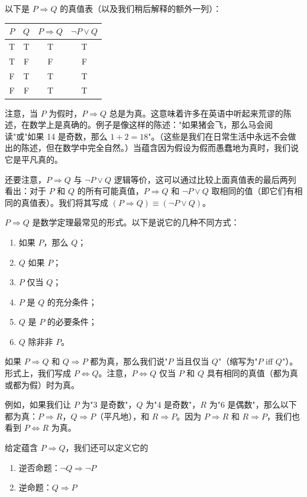\documentclass[11pt]{article}
\begin{document}
以下是 $P \Rightarrow Q$ 的真值表（以及我们稍后解释的额外一列）：

\begin{center}
\begin{tabular}{cc|c|c}
$P$ & $Q$ & $P \Rightarrow Q$ & $\neg P \lor Q$ \\
\hline
T & T & T & T \\
T & F & F & F \\
F & T & T & T \\
F & F & T & T
\end{tabular}
\end{center}

注意，当 $P$ 为假时，$P \Rightarrow Q$ 总是为真。这意味着许多在英语中听起来荒谬的陈述，在数学上是真确的。例子是像这样的陈述："如果猪会飞，那么马会阅读"或"如果 14 是奇数，那么 $1 + 2 = 18$"。（这些是我们在日常生活中永远不会做出的陈述，但在数学中完全自然。）当蕴含因为假设为假而愚蠢地为真时，我们说它是平凡真的。

还要注意，$P \Rightarrow Q$ 与 $\neg P \lor Q$ 逻辑等价，这可以通过比较上面真值表的最后两列看出：对于 $P$ 和 $Q$ 的所有可能真值，$P \Rightarrow Q$ 和 $\neg P \lor Q$ 取相同的值（即它们有相同的真值表）。我们将其写成 $(P \Rightarrow Q) \equiv (\neg P \lor Q)$。

$P \Rightarrow Q$ 是数学定理最常见的形式。以下是说它的几种不同方式：
\begin{enumerate}
\item 如果 $P$，那么 $Q$；
\item $Q$ 如果 $P$；
\item $P$ 仅当 $Q$；
\item $P$ 是 $Q$ 的充分条件；
\item $Q$ 是 $P$ 的必要条件；
\item $Q$ 除非非 $P$。
\end{enumerate}

如果 $P \Rightarrow Q$ 和 $Q \Rightarrow P$ 都为真，那么我们说"$P$ 当且仅当 $Q$"（缩写为"$P$ iff $Q$"）。形式上，我们写成 $P \Leftrightarrow Q$。注意，$P \Leftrightarrow Q$ 仅当 $P$ 和 $Q$ 具有相同的真值（都为真或都为假）时为真。

例如，如果我们让 $P$ 为"3 是奇数"，$Q$ 为"4 是奇数"，$R$ 为"6 是偶数"，那么以下都为真：$P \Rightarrow R$，$Q \Rightarrow P$（平凡地），和 $R \Rightarrow P$。因为 $P \Rightarrow R$ 和 $R \Rightarrow P$，我们也看到 $P \Leftrightarrow R$ 为真。

给定蕴含 $P \Rightarrow Q$，我们还可以定义它的
\begin{enumerate}
\item[(a)] 逆否命题：$\neg Q \Rightarrow \neg P$
\item[(b)] 逆命题：$Q \Rightarrow P$
\end{enumerate}
\end{document}

